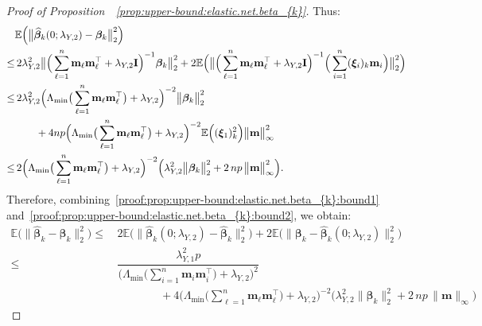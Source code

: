 \documentclass[
  12pt]{article}
\def\E{\mathbb{E}}
\def\M{\mathbf{m}}
\begin{document}
\begin{proof}[Proof of Proposition~~\ref{prop:upper-bound:elastic.net.beta_{k}}]
	Thus:
	\begin{align}  
		&\E \Big( \big\|   \widehat{\bm{\beta}}_{k} (0;\lambda_{Y,2})      -   \bm{\beta}_{k}    \big\|_{2}^{2} \Big)
		\nonumber  
		\\
		\leq & \,  2 \lambda_{Y,2}^{2}   \big\|  \Big(  \sum_{\ell = 1}^{n} \M_{\ell}   \M_{\ell}^{\top}  + \lambda_{Y,2} \mathbf{I}      \Big)^{-1}  \bm{\beta}_{k}  \big\|_{2}^{2}   
		+  2 \E  \Big( \big\|  \Big(  \sum_{\ell = 1}^{n} \M_{\ell}   \M_{\ell}^{\top}  + \lambda_{Y,2} \mathbf{I}      \Big)^{-1} \Big( \sum_{i=1}^{n}  (\bm{\xi}_{i})_{k}  \M_{i}   \Big)   \big\|_{2}^{2}  \Big)
		\nonumber  
		\\
		\leq & \,  2 \lambda_{Y,2}^{2}  \Big(  \Lambda_{\min} \big( \sum_{\ell = 1}^{n} \M_{\ell}   \M_{\ell}^{\top}  \big) + \lambda_{Y,2}  \Big)^{-2}   \big\| \bm{\beta}_{k}   \big\|_{2}^{2}    \nonumber
		\\
		& \qquad  +   4np \Big(  \Lambda_{\min} \big( \sum_{\ell = 1}^{n} \M_{\ell}   \M_{\ell}^{\top}  \big) + \lambda_{Y,2}  \Big)^{-2}   \E \Big( (\bm{\xi}_{1})_{k}^{2} \Big)  \big\|  
        \M \big\|_{\infty}^{2}
		\nonumber  
		\\
		\leq &  \,  2  \Big(  \Lambda_{\min} \big(  \sum_{\ell = 1}^{n} \M_{\ell}   \M_{\ell}^{\top}  \big) + \lambda_{Y,2}  \Big)^{-2}   \Big(  \lambda_{Y,2}^{2}   \big\| \bm{\beta}_{k}   \big\|_{2}^{2}  +  2 \,n p  \,     \big\| \M \big\|^2_{\infty} \Big) .
		\label{proof:prop:upper-bound:elastic.net.beta_{k}:bound2}
	\end{align} 
	Therefore,   combining~\eqref{proof:prop:upper-bound:elastic.net.beta_{k}:bound1} and~\eqref{proof:prop:upper-bound:elastic.net.beta_{k}:bound2}, we  obtain: 
	\begin{align*}
		\E \Big( \big\|  \widehat{\bm{\beta}}_{k}  -  \bm{\beta}_{k}  \big\|_{2}^{2} \Big)   
		\leq &  \, 2 \E \Big( \big\|  \widehat{\bm{\beta}}_{k}(0 ; \lambda_{Y,2})  -  \widehat{\bm{\beta}}_{k} \big\|_{2}^{2} \Big)    +  2 \E \Big( \big\|    \bm{\beta}_{k}   -  \widehat{\bm{\beta}}_{k} (0 ; \lambda_{Y,2}) \big\|_{2}^{2} \Big)    
		\\
		\leq & \,   \dfrac{ \lambda_{Y,1}^{2} p }{ \Big(  \Lambda_{\min} \big(  \sum_{i=1}^{n} \M_{i} \M_{i}^{\top} \big)  +   \lambda_{Y,2}  \Big)^{2} }  
		\\ &  \qquad \qquad   +
		4  \Big(  \Lambda_{\min} \big(  \sum_{\ell = 1}^{n} \M_{\ell}   \M_{\ell}^{\top}  \big) + \lambda_{Y,2}  \Big)^{-2}   \Big(  \lambda_{Y,2}^{2}   \big\| \bm{\beta}_{k}   \big\|_{2}^{2}  +  2 \, np  \,    \big\| \M \big\|_{\infty} \Big)   

\end{align*}
\end{proof}
\end{document}
